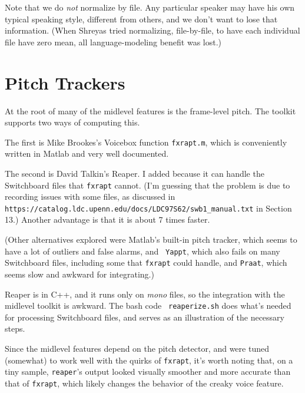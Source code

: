 \documentclass[11pt]{article}
\begin{document}

Note that we do {\em not} normalize by file.  Any particular speaker
may have his own typical speaking style, different from others, and we
don't want to lose that information.  (When Shreyas tried normalizing,
file-by-file, to have each individual file have zero mean, all
language-modeling benefit was lost.)

\section{Pitch Trackers}   \label{sec:pitch}

At the root of many of the midlevel features is the frame-level pitch.
The toolkit supports two ways of computing this.  

The first is Mike Brookes's Voicebox function {\tt fxrapt.m}, which is
conveniently written in Matlab and very well documented.

The second is David Talkin's Reaper.  I added because it can handle
the Switchboard files that {\tt fxrapt} cannot.  (I'm guessing that
the problem is due to recording issues with some files, as discussed
in {\tt https://catalog.ldc.upenn.edu/docs/LDC97S62/swb1\_manual.txt}
in Section 13.)  Another advantage is that it is about 7 times faster.

(Other alternatives explored were Matlab's built-in pitch tracker,
which seems to have a lot of outliers and false alarms, and {\tt
  Yappt}, which also fails on many Switchboard files, including some
that {\tt fxrapt} could handle, and {\tt Praat}, which seems slow and
awkward for integrating.)

Reaper is in C++, and it runs only on {\it mono} files, so the
integration with the midlevel toolkit is awkward. The bash code {\tt
  reaperize.sh} does what's needed for processing Switchboard files,
and serves as an illustration of the necessary steps.

Since the midlevel features depend on the pitch detector, and were
tuned (somewhat) to work well with the quirks of {\tt fxrapt}, it's
worth noting that, on a tiny sample, {\tt reaper}'s output looked
visually smoother and more accurate than that of {\tt fxrapt}, which
likely  changes the behavior of the creaky voice feature.
\end{document}

